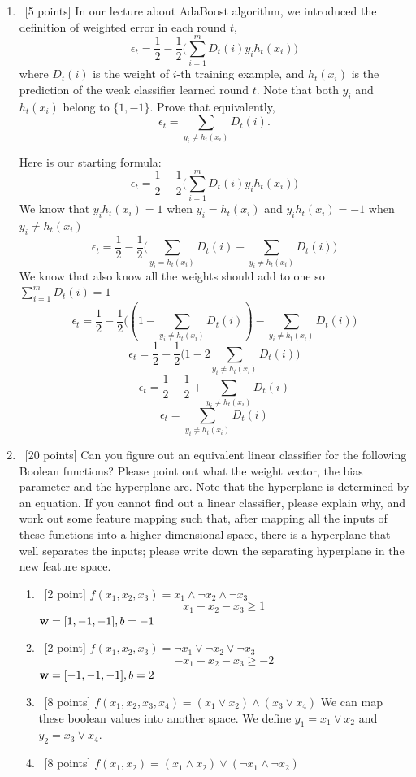 \documentclass[12pt, fullpage,letterpaper]{article}
\begin{document}
\begin{enumerate}
\item~[5 points] In our lecture about AdaBoost algorithm, we introduced the definition of weighted error in each round $t$, 
\[
\epsilon_t = \frac{1}{2} - \frac{1}{2}\big(\sum_{i=1}^m D_t(i) y_i h_t(x_i)\big)
\]
where $D_t(i)$ is the weight of $i$-th training example, and $h_t(x_i)$ is the prediction of the weak classifier learned round $t$. Note that both $y_i$ and $h_t(x_i)$ belong to $\{1, -1\}$. Prove that equivalently,
\[
\epsilon_t = \sum_{y_i \neq h_t(x_i)} D_t(i).
\]

Here is our starting formula:
\[
\epsilon_t = \frac{1}{2} - \frac{1}{2}\big(\sum_{i=1}^m D_t(i) y_i h_t(x_i)\big)
\]
We know that $y_i h_t(x_i) = 1$ when $y_i = h_t(x_i)$ and $y_i h_t(x_i) = -1$ when $y_i \neq h_t(x_i)$
\[
\epsilon_t = \frac{1}{2} - \frac{1}{2}\big(\sum_{y_i = h_t(x_i)} D_t(i) - \sum_{y_i \neq h_t(x_i)} D_t(i)\big)
\]
We know that also know all the weights should add to one so $\sum_{i=1}^m D_t(i) = 1$ 
\[
\epsilon_t = \frac{1}{2} - \frac{1}{2}\big((1 - \sum_{y_i \neq h_t(x_i)} D_t(i)) - \sum_{y_i \neq h_t(x_i)} D_t(i)\big)
\]
\[
\epsilon_t = \frac{1}{2} - \frac{1}{2}\big(1 - 2\sum_{y_i \neq h_t(x_i)} D_t(i)\big)
\]
\[
\epsilon_t = \frac{1}{2} - \frac{1}{2} + \sum_{y_i \neq h_t(x_i)} D_t(i)
\]
\[
\epsilon_t = \sum_{y_i \neq h_t(x_i)} D_t(i)
\]

\item~[20 points] Can you figure out an equivalent linear classifier for the following Boolean functions? Please point out what the weight vector, the bias parameter and the hyperplane are. Note that the hyperplane is determined by an equation. If you cannot find out a  linear classifier, please explain why, and work out some feature mapping such that, after mapping all the inputs of these functions into a higher dimensional space, there is a hyperplane that well separates the inputs; please write down the separating hyperplane in the new feature space. 
	\begin{enumerate}
		\item~[2 point] $f(x_1, x_2, x_3) = x_1 \land \neg x_2 \land \neg x_3$
		\[x_1 - x_2 - x_3 \geq 1\]
		${\bf w} = [1, -1, -1], b=-1$
		\item~[2 point] $f(x_1, x_2, x_3) = \neg x_1 \lor \neg x_2 \lor \neg x_3$ 
		\[-x_1 - x_2 - x_3 \geq -2\]
		${\bf w} = [-1,-1,-1], b=2$
		\item~[8 points] $f(x_1, x_2, x_3, x_4) = (x_1 \lor x_2) \land (x_3 \lor x_4)$\newline
		We can map these boolean values into another space.  We define $y_1 = x_1 \lor x_2$ and $y_2 = x_3 \lor x_4$.
		\item ~[8 points] $f(x_1, x_2) = (x_1 \land x_2) \lor (\neg x_1 \land \neg x_2)$
	\end{enumerate}
		

\end{enumerate}
\end{document}
